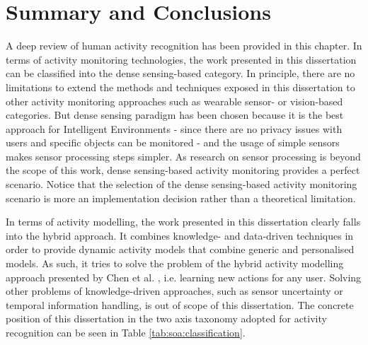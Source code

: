 \section{Summary and Conclusions}
\label{sec:soa:summary}


A deep review of human activity recognition has been provided in this chapter. In terms of activity monitoring technologies, the work presented in this dissertation can be classified into the dense sensing-based category. In principle, there are no limitations to extend the methods and techniques exposed in this dissertation to other activity monitoring approaches such as wearable sensor- or vision-based categories. But dense sensing paradigm has been chosen because it is the best approach for Intelligent Environments - since there are no privacy issues with users and specific objects can be monitored - and the usage of simple sensors makes sensor processing steps simpler. As research on sensor processing is beyond the scope of this work, dense sensing-based activity monitoring provides a perfect scenario. Notice that the selection of the dense sensing-based activity monitoring scenario is more an implementation decision rather than a theoretical limitation.

In terms of activity modelling, the work presented in this dissertation clearly falls into the hybrid approach. It combines knowledge- and data-driven techniques in order to provide dynamic activity models that combine generic and personalised models. As such, it tries to solve the problem of the hybrid activity modelling approach presented by Chen et al. \cite{Chen2014}, i.e. learning new actions for any user. Solving other problems of knowledge-driven approaches, such as sensor uncertainty or temporal information handling, is out of scope of this dissertation. The concrete position of this dissertation in the two axis taxonomy adopted for activity recognition can be seen in Table \ref{tab:soa:classification}.

